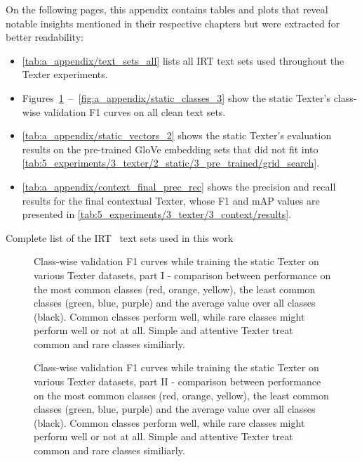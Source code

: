 On the following pages, this appendix contains tables and plots that reveal notable insights mentioned in their respective chapters but were extracted for better readability:

\begin{itemize}
    \item \autoref{tab:a_appendix/text_sets_all} lists all IRT text sets used throughout the Texter experiments.

    \item Figures~\ref{fig:a_appendix/static_classes_1}~--~\ref{fig:a_appendix/static_classes_3} show the static Texter's class-wise validation F1 curves on all clean text sets.

    \item \autoref{tab:a_appendix/static_vectors_2} shows the static Texter's evaluation results on the pre-trained GloVe embedding sets that did not fit into \autoref{tab:5_experiments/3_texter/2_static/3_pre_trained/grid_search}.

    \item \autoref{tab:a_appendix/context_final_prec_rec} shows the precision and recall results for the final contextual Texter, whose F1 and mAP values are presented in \autoref{tab:5_experiments/3_texter/3_context/results}.
\end{itemize}

\begin{table}
    \centering
    
    \caption{Complete list of the IRT~\cite{IRT} text sets used in this work}
    \label{tab:a_appendix/text_sets_all}
\end{table}

\begin{figure}
    \centering
    
    \caption{Class-wise validation F1 curves while training the static Texter on various Texter datasets, part I - comparison between performance on the most common classes (red, orange, yellow), the least common classes (green, blue, purple) and the average value over all classes (black). Common classes perform well, while rare classes might perform well or not at all. Simple and attentive Texter treat common and rare classes similiarly.}
    \label{fig:a_appendix/static_classes_1}
\end{figure}

\begin{figure}
    \centering
    
    \caption{Class-wise validation F1 curves while training the static Texter on various Texter datasets, part II - comparison between performance on the most common classes (red, orange, yellow), the least common classes (green, blue, purple) and the average value over all classes (black). Common classes perform well, while rare classes might perform well or not at all. Simple and attentive Texter treat common and rare classes similiarly.}
    \label{fig:a_appendix/static_classes_2}
\end{figure}

